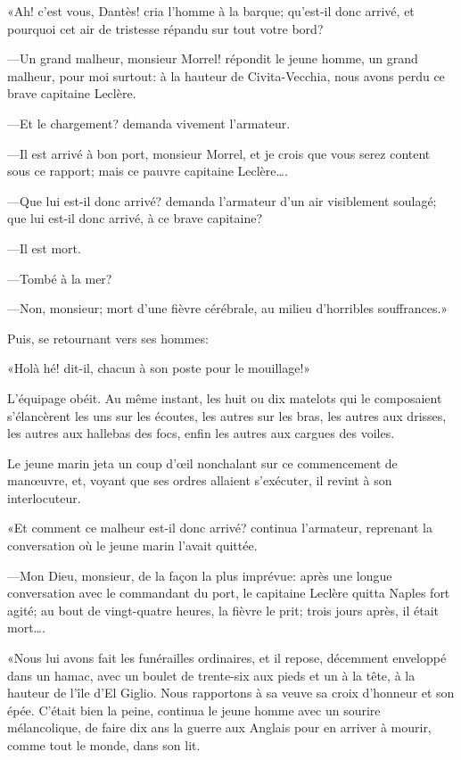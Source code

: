 «Ah! c'est vous, Dantès! cria l'homme à la barque; qu'est-il donc arrivé, et pourquoi cet air de tristesse répandu sur tout votre bord?

—Un grand malheur, monsieur Morrel! répondit le jeune homme, un grand malheur, pour moi surtout: à la hauteur de Civita-Vecchia, nous avons perdu ce brave capitaine Leclère.

—Et le chargement? demanda vivement l'armateur.

—Il est arrivé à bon port, monsieur Morrel, et je crois que vous serez content sous ce rapport; mais ce pauvre capitaine Leclère\dots.

—Que lui est-il donc arrivé? demanda l'armateur d'un air visiblement soulagé; que lui est-il donc arrivé, à ce brave capitaine?

—Il est mort.

—Tombé à la mer?

—Non, monsieur; mort d'une fièvre cérébrale, au milieu d'horribles souffrances.»

Puis, se retournant vers ses hommes:

«Holà hé! dit-il, chacun à son poste pour le mouillage!»

L'équipage obéit. Au même instant, les huit ou dix matelots qui le composaient s'élancèrent les uns sur les écoutes, les autres sur les bras, les autres aux drisses, les autres aux hallebas des focs, enfin les autres aux cargues des voiles.

Le jeune marin jeta un coup d'œil nonchalant sur ce commencement de manœuvre, et, voyant que ses ordres allaient s'exécuter, il revint à son interlocuteur.

«Et comment ce malheur est-il donc arrivé? continua l'armateur, reprenant la conversation où le jeune marin l'avait quittée.

—Mon Dieu, monsieur, de la façon la plus imprévue: après une longue conversation avec le commandant du port, le capitaine Leclère quitta Naples fort agité; au bout de vingt-quatre heures, la fièvre le prit; trois jours après, il était mort\dots.

«Nous lui avons fait les funérailles ordinaires, et il repose, décemment enveloppé dans un hamac, avec un boulet de trente-six aux pieds et un à la tête, à la hauteur de l'île d'El Giglio. Nous rapportons à sa veuve sa croix d'honneur et son épée. C'était bien la peine, continua le jeune homme avec un sourire mélancolique, de faire dix ans la guerre aux Anglais pour en arriver à mourir, comme tout le monde, dans son lit.

